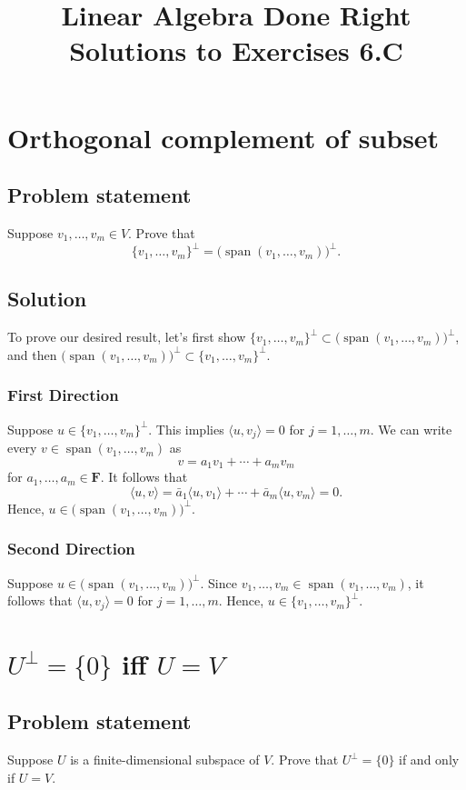 \documentclass{article}
\title{Linear Algebra Done Right\\Solutions to Exercises 6.C}
\author{}
\date{}
\begin{document}
\maketitle

\section{Orthogonal complement of subset}
\subsection*{Problem statement}
Suppose $v_1,\ldots,v_m\in V$. 
Prove that 
\[\{v_1,\ldots,v_m\}^\bot = \big( \operatorname{span}(v_1,\ldots,v_m) \big)^\bot.\]

\subsection*{Solution}
To prove our desired result, let's first show $\{v_1,\ldots,v_m\}^\bot \subset \big( \operatorname{span}(v_1,\ldots,v_m) \big)^\bot$, and then $\big( \operatorname{span}(v_1,\ldots,v_m) \big)^\bot \subset \{v_1,\ldots,v_m\}^\bot$.

\subsubsection*{First Direction}
Suppose $u\in \{v_1,\ldots,v_m\}^\bot$. 
This implies $\langle u, v_j\rangle=0$ for $j=1,\ldots,m$. 
We can write every $v\in\operatorname{span}(v_1,\ldots,v_m)$ as
\[v=a_1 v_1+\cdots + a_m v_m\]
for $a_1,\ldots,a_m\in\mathbf{F}$.
It follows that
\[\langle u,v\rangle = \bar{a}_1\langle u,v_1\rangle+\cdots+ \bar{a}_m\langle u,v_m\rangle=0.\]
Hence, $u\in \big( \operatorname{span}(v_1,\ldots,v_m) \big)^\bot$.

\subsubsection*{Second Direction}
Suppose $u\in \big( \operatorname{span}(v_1,\ldots,v_m) \big)^\bot$. 
Since $v_1,\ldots,v_m\in \operatorname{span}(v_1,\ldots,v_m)$, it follows that $\langle u,v_j\rangle = 0$ for $j=1,\ldots,m$. 
Hence, $u\in \{v_1,\ldots,v_m\}^\bot$.

\clearpage

\section{$U^\bot=\{0\}$ iff $U=V$}
\subsection*{Problem statement}
Suppose $U$ is a finite-dimensional subspace of $V$. 
Prove that $U^\bot=\{0\}$ if and only if $U=V$.
\end{document}
